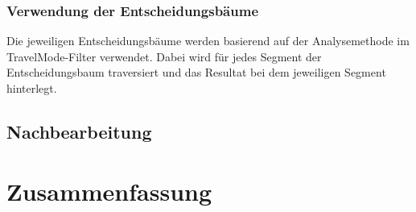 \subsubsection{Verwendung der Entscheidungsbäume}
\label{entscheidungsbaum_verwendung}
Die jeweiligen Entscheidungsbäume werden basierend auf der Analysemethode im TravelMode-Filter verwendet. Dabei wird für jedes Segment der Entscheidungsbaum traversiert und das Resultat bei dem jeweiligen Segment hinterlegt.

\subsection{Nachbearbeitung}

\clearpage
\section{Zusammenfassung}
